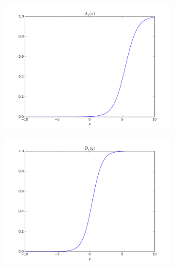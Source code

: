 \documentclass[paper=a4, fontsize=11pt]{scrartcl} %
\numberwithin{equation}{section} %
\numberwithin{figure}{section} %
\numberwithin{table}{section} %
\begin{document}
\begin{figure}[h]
\begin{subfigure}[b]{0.45\textwidth}
\includegraphics[width=\textwidth]{img/figure_7.png}
\end{subfigure}
\begin{subfigure}[b]{0.45\textwidth}
\includegraphics[width=\textwidth]{img/figure_8.png}
\end{subfigure}


\end{figure}
\end{document}
